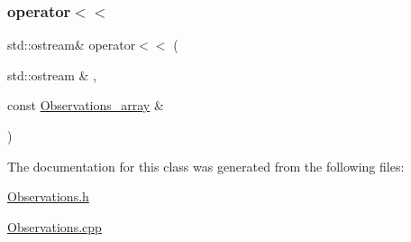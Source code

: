 \subsubsection{\texorpdfstring{operator$<$$<$}{operator<<}}
{\footnotesize\ttfamily std\+::ostream\& operator$<$$<$ (\begin{DoxyParamCaption}\item[{std\+::ostream \&}]{,  }\item[{const \mbox{\hyperlink{class_observations__array}{Observations\+\_\+array}} \&}]{ }\end{DoxyParamCaption})\hspace{0.3cm}{\ttfamily [friend]}}



The documentation for this class was generated from the following files\+:\begin{DoxyCompactItemize}
\item 
\mbox{\hyperlink{_observations_8h}{Observations.\+h}}\item 
\mbox{\hyperlink{_observations_8cpp}{Observations.\+cpp}}\end{DoxyCompactItemize}
